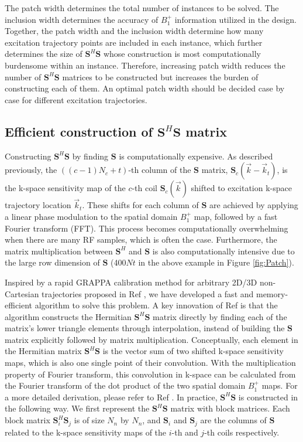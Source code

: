 \par The patch width determines the total number of instances to be solved. The inclusion width determines the accuracy of $B_1^+$ information utilized in the design. Together, the patch width and the inclusion width determine how many excitation trajectory points are included in each instance, which further determines the size of $\bm{S}^{H}\bm{S}$ whose construction is most computationally burdensome within an instance. Therefore, increasing patch width reduces the number of $\bm{S}^{H}\bm{S}$ matrices to be constructed but increases the burden of constructing each of them. An optimal patch width should be decided case by case for different excitation trajectories. 

\subsection*{Efficient construction of $\bm{S}^{H}\bm{S}$ matrix}
\par Constructing $\bm{S}^{H}\bm{S}$ by finding $\bm{S}$ is computationally expensive. As described previously, the $((c-1)N_c+t)$-th column of the  $\bm{S}$ matrix, $\bm{S}_c(\vec{k}-\vec{k}_t)$, is the k-space sensitivity map of the $c$-th coil $\bm{S}_c(\vec{k})$ shifted to excitation k-space trajectory location $\vec{k}_t$. These shifts for each column of $\bm{S}$ are achieved by applying a linear phase modulation to the spatial domain $B_1^+$ map, followed by a fast Fourier transform (FFT). This process becomes computationally overwhelming when there are many RF samples, which is often the case. Furthermore, the matrix multiplication between $\bm{S}^{H}$ and $\bm{S}$ is also computationally intensive due to the large row dimension of $\bm{S}$ (400$Nt$ in the above example in Figure \ref{fig:Patch}).  


\par Inspired by a rapid GRAPPA calibration method for arbitrary 2D/3D non-Cartesian trajectories proposed in Ref \cite{luo2019grappa}, we have developed a fast and memory-efficient algorithm to solve this problem. A key innovation of Ref \cite{luo2019grappa} is that the algorithm constructs the Hermitian $\bm{S}^{H}\bm{S}$ matrix directly by finding each of the matrix's lower triangle elements through interpolation, instead of building the $\bm{S}$ matrix explicitly followed by matrix multiplication. Conceptually, each element in the Hermitian matrix $\bm{S}^{H}\bm{S}$ is the vector sum of two shifted k-space sensitivity maps, which is also one single point of their convolution. With the multiplication property of Fourier transform, this convolution in k-space can be calculated from the Fourier transform of the dot product of the two spatial domain $B_1^+$ maps. For a more detailed derivation, please refer to Ref \cite{luo2019grappa}.
In practice, $\bm{S}^{H}\bm{S}$ is constructed in the following way. We first represent the $\bm{S}^{H}\bm{S}$ matrix with block matrices. Each block matrix $\bm{S}_i^{H}\bm{S}_j$ is of size $N_n$ by $N_n$, and $\bm{S}_i$ and $\bm{S}_j$ are the columns of $\bm{S}$ related to the k-space sensitivity maps of the $i$-th and $j$-th coils respectively.

